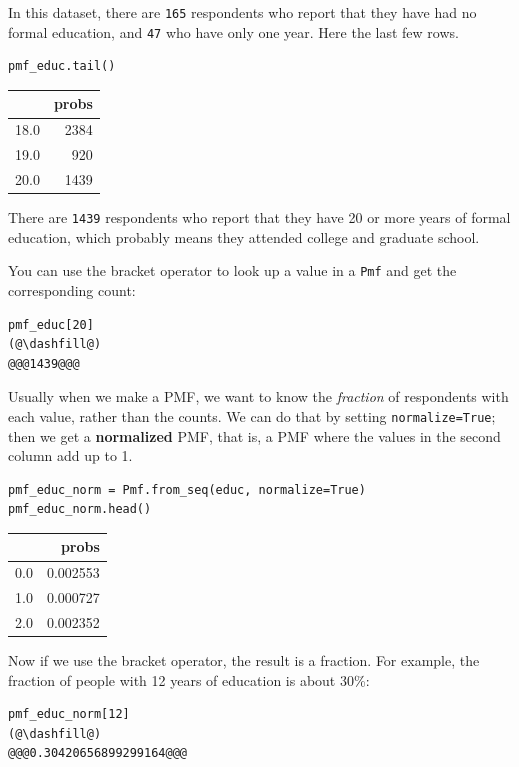 In this dataset, there are \passthrough{\lstinline!165!} respondents who
report that they have had no formal education, and
\passthrough{\lstinline!47!} who have only one year. Here the last few
rows.

\begin{lstlisting}[]
pmf_educ.tail()
\end{lstlisting}

\begin{tabular}{lr}
\midrule
{} &  probs \\
\midrule
18.0 &   2384 \\
19.0 &    920 \\
20.0 &   1439 \\
\midrule
\end{tabular}

There are \passthrough{\lstinline!1439!} respondents who report that
they have 20 or more years of formal education, which probably means
they attended college and graduate school.

You can use the bracket operator to look up a value in a
\passthrough{\lstinline!Pmf!} and get the corresponding count:

\begin{lstlisting}[]
pmf_educ[20]
(@\dashfill@)
@@@1439@@@
\end{lstlisting}

Usually when we make a PMF, we want to know the \emph{fraction} of
respondents with each value, rather than the counts. We can do that by
setting \passthrough{\lstinline!normalize=True!}; then we get a
\textbf{normalized} PMF, that is, a PMF where the values in the second
column add up to 1.

\begin{lstlisting}[]
pmf_educ_norm = Pmf.from_seq(educ, normalize=True)
pmf_educ_norm.head()
\end{lstlisting}

\begin{tabular}{lr}
\midrule
{} &     probs \\
\midrule
0.0 &  0.002553 \\
1.0 &  0.000727 \\
2.0 &  0.002352 \\
\midrule
\end{tabular}

Now if we use the bracket operator, the result is a fraction. For
example, the fraction of people with 12 years of education is about
30\%:

\begin{lstlisting}[]
pmf_educ_norm[12]
(@\dashfill@)
@@@0.30420656899299164@@@
\end{lstlisting}

